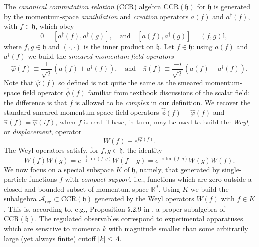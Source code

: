 \documentclass[11pt]{amsart}
\DeclareMathOperator{\im}{Im}
\theoremstyle{plain}%
\theoremstyle{definition}
\theoremstyle{remark}
\begin{document}
The \emph{canonical commutation relation} (CCR) algebra $\text{CCR}(\mathfrak{h})$ for $\mathfrak{h}$ is generated by the momentum-space \emph{annihilation} and \emph{creation} operators $a(f)$ and $a^\dag(f)$, with $f\in\mathfrak{h}$, which obey
\begin{equation}
	[a(f), a(g)] = 0 = [a^\dag(f), a^\dag(g)], \quad \text{and}\quad [a(f), a^\dag(g)] = (f,g)\mathbb{I},
\end{equation}
where $f, g\in \mathfrak{h}$ and $(\cdot, \cdot)$ is the inner product on $\mathfrak{h}$. Let $f\in \mathfrak{h}$: using $a(f)$ and $a^\dag(f)$ we build the \emph{smeared momentum field operators}
\begin{equation}
	\widehat{\varphi}(f) \equiv \frac{1}{\sqrt2}(a(f) + a^\dag(f)), \quad \text{and} \quad \widehat{\pi}(f) \equiv \frac{-i}{\sqrt2}(a(f) - a^\dag(f)).
\end{equation}
Note that $\widehat{\varphi}(f)$ so defined is not quite the same as the smeared momentum-space field operator $\widehat{\phi}(f)$ familiar from textbook discussions of the scalar field: the difference is that $f$ is allowed to be \emph{complex} in our definition. We recover the standard smeared momentum-space field operators $\widehat{\phi}(f) = \widehat{\varphi}(f)$ and $\widehat{\pi}(f) = \widehat{\varphi}(if)$, when $f$ is real. These, in turn, may be used to build the \emph{Weyl}, or \emph{displacement}, operator
\begin{equation}
	W(f) \equiv e^{i\widehat{\varphi}(f)}.
\end{equation}
The Weyl operators satisfy, for $f, g \in \mathfrak{h}$, the identity
\begin{equation}
	W(f)W(g) = e^{-\frac{i}{2}\im(f,g)}W(f+g) = e^{-{i}\im(f,g)}W(g)W(f).
\end{equation}
We now focus on a special subspace $K$ of $\mathfrak{h}$, namely, that generated by single-particle functions $f$ with \emph{compact support}, i.e., functions which are zero outside a closed and bounded subset of momentum space $\mathbb{R}^d$. Using $K$ we build the subalgebra $\mathcal{A}_{\text{reg}}\subset \text{CCR}(\mathfrak{h})$ generated by the Weyl operators $W(f)$ with $f\in K$. This is, according to, e.g., Proposition 5.2.9 in \cite{bratteli_operator_1997}, a proper subalgebra of $\text{CCR}(\mathfrak{h})$. The regulated observables correspond to experimental apparatuses which are sensitive to momenta $k$ with magnitude smaller than some arbitrarily large (yet always finite) cutoff $|k| \le \Lambda$.
\end{document}
